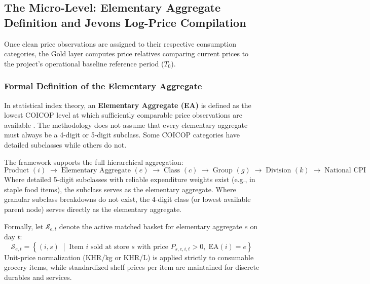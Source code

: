 \subsection{The Micro-Level: Elementary Aggregate Definition and Jevons Log-Price Compilation}
\hs Once clean price observations are assigned to their respective consumption categories, the Gold layer computes price relatives comparing current prices to the project's operational baseline reference period ($T_0$).

\subsubsection{Formal Definition of the Elementary Aggregate}
\hs In statistical index theory, an \textbf{Elementary Aggregate (EA)} is defined as the lowest COICOP level at which sufficiently comparable price observations are available \citep{imf2020cpi}. The methodology does not assume that every elementary aggregate must always be a 4-digit or 5-digit subclass. Some COICOP categories have detailed subclasses while others do not.

The framework supports the full hierarchical aggregation:
$$\text{Product } (i) \;\longrightarrow\; \text{Elementary Aggregate } (e) \;\longrightarrow\; \text{Class } (c) \;\longrightarrow\; \text{Group } (g) \;\longrightarrow\; \text{Division } (k) \;\longrightarrow\; \text{National CPI}$$
Where detailed 5-digit subclasses with reliable expenditure weights exist (e.g., in staple food items), the subclass serves as the elementary aggregate. Where granular subclass breakdowns do not exist, the 4-digit class (or lowest available parent node) serves directly as the elementary aggregate.

Formally, let $\mathcal{S}_{e, t}$ denote the active matched basket for elementary aggregate $e$ on day $t$:
\begin{equation}
    \mathcal{S}_{e, t} = \left\{ (i, s) \;\middle|\; \text{Item } i \text{ sold at store } s \text{ with price } P_{s,e,i,t} > 0, \; \text{EA}(i) = e \right\}
\end{equation}
Unit-price normalization (KHR/kg or KHR/L) is applied strictly to consumable grocery items, while standardized shelf prices per item are maintained for discrete durables and services.

